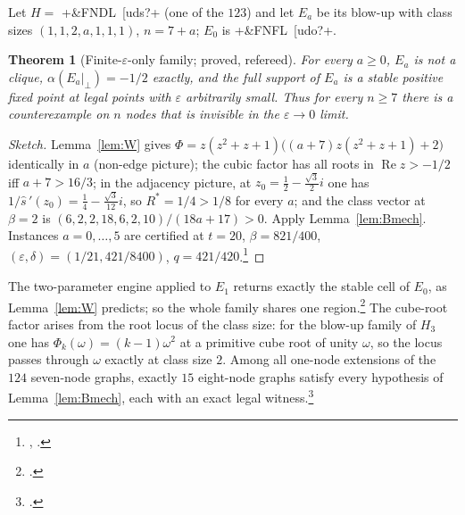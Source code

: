 \documentclass[11pt]{article}
\newtheorem{theorem}{Theorem}[section]
\theoremstyle{definition}
\newcommand{\eps}{\varepsilon}
\newcommand{\perpc}[1]{#1|_{\perp}}
\newcommand{\Rea}{\operatorname{Re}}
\begin{document}
Let $H=$ \dsix+&FNDL~[uds?+ (one of the $123$) and let $E_a$ be its blow-up with class sizes $(1,1,2,a,1,1,1)$, $n=7+a$; $E_0$ is
\dsix+&FNFL~[udo?+.

\begin{theorem}[Finite-$\eps$-only family; proved, refereed]\label{thm:famE}
For every $a\ge0$, $E_a$ is not a clique, $\alpha(\perpc{E_a})=-1/2$ exactly, and the full support of $E_a$ is a stable positive
fixed point at legal points with $\eps$ arbitrarily small. Thus for every $n\ge7$ there is a counterexample on $n$ nodes that
is invisible in the $\eps\to0$ limit.
\end{theorem}
\begin{proof}[Sketch]
Lemma~\ref{lem:W} gives $\Phi=z(z^2+z+1)\bigl((a+7)z(z^2+z+1)+2\bigr)$ identically in $a$ (non-edge picture); the cubic factor has all roots
in $\Rea z>-1/2$ iff $a+7>16/3$; in the adjacency picture, at $z_0=\tfrac12-\tfrac{\sqrt3}{2}i$ one has $1/\hat s\,'(z_0)=\tfrac14-\tfrac{\sqrt3}{12}i$, so $R^*=1/4>1/8$
for every $a$; and the class vector at $\beta=2$ is $(6,2,2,18,6,2,10)/(18a+17)>0$. Apply Lemma~\ref{lem:Bmech}.
Instances $a=0,\dots,5$ are certified at $t=20$, $\beta=821/400$, $(\eps,\delta)=(1/21,421/8400)$, $q=421/420$.\footnote{, .}
\end{proof}
The two-parameter engine applied to $E_1$ returns exactly the stable cell of $E_0$, as Lemma~\ref{lem:W} predicts; so the whole
family shares one region.\footnote{.} The cube-root factor arises from the root
locus of the class size: for the blow-up family of $H_3$ one has $\Phi_k(\omega)=(k-1)\omega^2$ at a primitive cube root of
unity $\omega$, so the locus passes through $\omega$ exactly at class size $2$. Among all one-node extensions of the $124$
seven-node graphs, exactly $15$ eight-node graphs satisfy every hypothesis of Lemma~\ref{lem:Bmech}, each with an exact legal
witness.\footnote{.}
\end{document}
